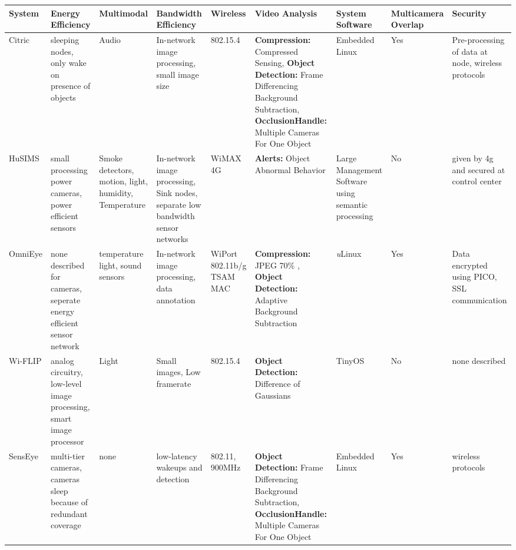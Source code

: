 \documentclass[journal,transmag]{IEEEtran}
\begin{document}
\begin{table}[t]
  \centering

  \begin{tabular}{| p{1.1cm} | p{2cm} | p{1.2cm}  | p{2.1cm} | p{1cm} | p{2.5cm} | p{1.5cm} | p{1.3cm}  | p{2cm} |}
    \hline
    System & Energy Efficiency & Multimodal & Bandwidth Efficiency & Wireless & Video Analysis & System Software & Multicamera Overlap & Security \\   \hline
    
    Citric & sleeping nodes, only wake on presence of objects & Audio & In-network image processing, small image size & 802.15.4
     	& \textbf{Compression:} Compressed Sensing, \textbf{Object Detection:} Frame Differencing Background Subtraction, \textbf{OcclusionHandle:} Multiple Cameras For One Object 
        & Embedded Linux & Yes & Pre-processing of data at node, wireless protocols \\ \hline
    
    HuSIMS & small processing power cameras, power efficient sensors & Smoke detectors, motion, light, humidity, Temperature 
    	& In-network image processing, Sink nodes, separate low bandwidth sensor networks  
    	& WiMAX 4G & \textbf{Alerts:} Object Abnormal Behavior & Large Management Software using semantic processing 
    	& No & given by 4g and secured at control center  \\ \hline
    
    OmniEye & none described for cameras, seperate energy efficient sensor network & temperature light, sound sensors 
    	& In-network image processing, data annotation 
    	& 	WiPort 802.11b/g TSAM MAC & \textbf{Compression:} JPEG 70\% ,   \textbf{Object Detection:} Adaptive Background Subtraction 
        & \textit{u}Linux & Yes & Data encrypted using PICO, SSL communication  \\ \hline
    
    Wi-FLIP & analog circuitry, low-level image processing, smart image processor & Light & Small images, Low framerate  
    	& 802.15.4 & \textbf{Object Detection:} Difference of Gaussians  & TinyOS & No & none described  \\ \hline
    
    SensEye & multi-tier cameras, cameras sleep because of redundant coverage  & none & low-latency wakeups and detection  
    	& 802.11,  900MHz  & \textbf{Object Detection:} Frame Differencing Background Subtraction, \textbf{OcclusionHandle:} Multiple Cameras For One Object  
        & Embedded Linux & Yes & wireless protocols  \\ \hline
    

\end{tabular}
\end{table}
\end{document}
